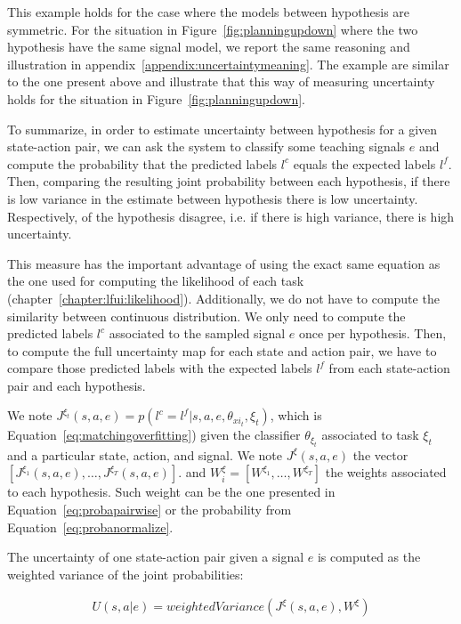This example holds for the case where the models between hypothesis are symmetric. For the situation in Figure~\ref{fig:planningupdown} where the two hypothesis have the same signal model, we report the same reasoning and illustration in appendix~\ref{appendix:uncertaintymeaning}. The example are similar to the one present above and illustrate that this way of measuring uncertainty holds for the situation in Figure~\ref{fig:planningupdown}.

To summarize, in order to estimate uncertainty between hypothesis for a given state-action pair, we can ask the system to classify some teaching signals $e$ and compute the probability that the predicted labels $l^c$ equals the expected labels $l^f$. Then, comparing the resulting joint probability between each hypothesis, if there is low variance in the estimate between hypothesis there is low uncertainty. Respectively, of the hypothesis disagree, i.e. if there is high variance, there is high uncertainty. 

This measure has the important advantage of using the exact same equation as the one used for computing the likelihood of each task (chapter~\ref{chapter:lfui:likelihood}). Additionally, we do not have to compute the similarity between continuous distribution. We only need to compute the predicted labels $l^c$ associated to the sampled signal $e$ once per hypothesis. Then, to compute the full uncertainty map for each state and action pair, we have to compare those predicted labels with the expected labels $l^f$ from each state-action pair and each hypothesis.

We note $J^{\xi_t}(s,a,e) = p(l^c = l^f | s, a, e, \theta_{xi_t}, \xi_t)$, which is Equation~\ref{eq:matchingoverfitting}) given the classifier $\theta_{\xi_t}$ associated to task $\xi_t$ and a particular state, action, and signal. We note $J^{\xi}(s,a,e)$ the vector $[J^{\xi_1}(s,a,e), \ldots, J^{\xi_T}(s,a,e)]$. and $W_{i}^{\xi} = [W^{\xi_1}, \ldots, W^{\xi_T}]$ the weights associated to each hypothesis. Such weight can be the one presented in Equation~\ref{eq:probapairwise} or the probability from Equation~\ref{eq:probanormalize}.

The uncertainty of one state-action pair given a signal $e$ is computed as the weighted variance of the joint probabilities:

\begin{eqnarray}
U(s,a|e) = weightedVariance(J^{\xi}(s,a,e), W^{\xi})
\label{eq:planningOneSignal}
\end{eqnarray}

